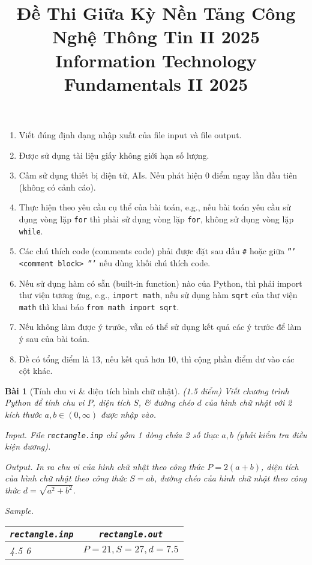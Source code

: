 \documentclass{article}
\title{Đề Thi Giữa Kỳ Nền Tảng Công Nghệ Thông Tin II 2025\\
Information Technology Fundamentals II 2025}
\date{}
\newtheorem{baitoan}{Bài}
\begin{document}
\maketitle
{}
\begin{enumerate}
	\item Viết đúng định dạng nhập xuất của file input và file output.
	\item Được sử dụng tài liệu giấy không giới hạn số lượng.
	\item Cấm sử dụng thiết bị điện tử, AIs. Nếu phát hiện 0 điểm ngay lần đầu tiên (không có cảnh cáo).
	\item Thực hiện theo yêu cầu cụ thể của bài toán, e.g., nếu bài toán yêu cầu sử dụng vòng lặp {\tt for} thì phải sử dụng vòng lặp {\tt for}, không sử dụng vòng lặp {\tt while}.
	\item Các chú thích code (comments code) phải được đặt sau dấu {\tt\#} hoặc giữa {\tt''' <comment block> '''} nếu dùng khối chú thích code.
	\item Nếu sử dụng hàm có sẵn (built-in function) nào của Python, thì phải import thư viện tương ứng, e.g., {\tt import math}, nếu sử dụng hàm {\tt sqrt} của thư viện {\tt math} thì khai báo {\tt from math import sqrt}.
	\item Nếu không làm được ý trước, vẫn có thể sử dụng kết quả các ý trước để làm ý sau của bài toán.
	\item Đề có tổng điểm là 13, nếu kết quả hơn 10, thì cộng phần điểm dư vào các cột khác.
\end{enumerate}

\begin{baitoan}[Tính chu vi \& diện tích hình chữ nhật]
	{\rm(1.5 điểm)} Viết chương trình Python để tính chu vi $P$, diện tích $S$, \& đường chéo $d$ của hình chữ nhật với 2 kích thước $a,b\in(0,\infty)$ được nhập vào.
	\item {\sf Input.} File {\tt rectangle.inp} chỉ gồm 1 dòng chứa 2 số thực $a,b$ (phải kiểm tra điều kiện dương).
	\item {\sf Output.} In ra chu vi của hình chữ nhật theo công thức $P = 2(a + b)$, diện tích của hình chữ nhật theo công thức $S = ab$, đường chéo của hình chữ nhật theo công thức $d = \sqrt{a^2 + b^2}$.
	\item {\sf Sample.}
	\begin{table}[H]
		\centering
		\begin{tabular}{|l|c|}
			\hline
			\verb|rectangle.inp| & \verb|rectangle.out| \\
			\hline
			4.5 6 & $P = 21,S = 27,d = 7.5$ \\
			\hline
		\end{tabular}
	\end{table}
\end{baitoan}
\end{document}
